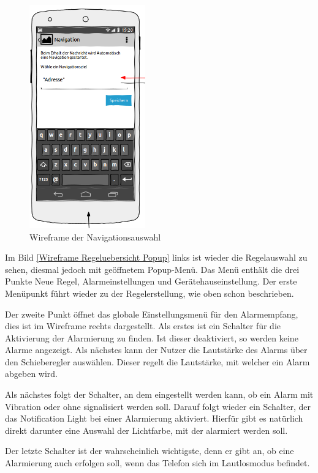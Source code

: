\begin{figure}[!ht]
\centering
\includegraphics[width=5cm]{Bilder/WireframeNaviAuswahl.png}
\caption{Wireframe der Navigationsauswahl}
\label{Wireframe NaviAuswahl}
\centering
\end{figure}
\FloatBarrier

Im Bild \ref{Wireframe Regeluebersicht Popup} links ist wieder die Regelauswahl zu sehen, diesmal jedoch mit ge\"offnetem Popup-Men\"u. Das Men\"u enth\"alt die drei Punkte Neue Regel, Alarmeinstellungen und Ger\"atehauseinstellung. Der erste Men\"upunkt f\"uhrt wieder zu der Regelerstellung, wie oben schon beschrieben. 

Der zweite Punkt \"offnet das globale Einstellungsmen\"u f\"ur den Alarmempfang, dies ist im Wireframe rechts dargestellt. Als erstes ist ein Schalter f\"ur die Aktivierung der Alarmierung zu finden. Ist dieser deaktiviert, so werden keine Alarme angezeigt. Als n\"achstes kann der Nutzer die Lautst\"arke des Alarms \"uber den Schieberegler ausw\"ahlen. Dieser regelt die Lautst\"arke, mit welcher ein Alarm abgeben wird.

Als n\"achstes folgt der Schalter, an dem eingestellt werden kann, ob ein Alarm mit Vibration oder ohne signalisiert werden soll. Darauf folgt wieder ein Schalter, der das Notification Light bei einer Alarmierung aktiviert. Hierf\"ur gibt es nat\"urlich direkt darunter eine Auswahl der Lichtfarbe, mit der alarmiert werden soll.

Der letzte Schalter ist der wahrscheinlich wichtigste, denn er gibt an, ob eine Alarmierung auch erfolgen soll, wenn das Telefon sich im Lautlosmodus befindet.

